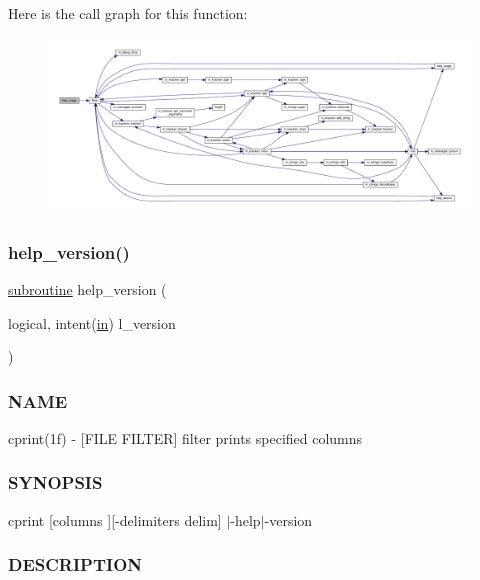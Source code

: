 Here is the call graph for this function\+:
\nopagebreak
\begin{figure}[H]
\begin{center}
\leavevmode
\includegraphics[width=350pt]{cprint_8f90_a3e09a3b52ee8fb04eeb93fe5761626a8_cgraph}
\end{center}
\end{figure}
\mbox{\label{cprint_8f90_a39c21619b08a3c22f19e2306efd7f766}} 
\subsubsection{\texorpdfstring{help\+\_\+version()}{help\_version()}}
{\footnotesize\ttfamily \hyperlink{M__stopwatch_83_8txt_acfbcff50169d691ff02d4a123ed70482}{subroutine} help\+\_\+version (\begin{DoxyParamCaption}\item[{logical, intent(\hyperlink{M__journal_83_8txt_afce72651d1eed785a2132bee863b2f38}{in})}]{l\+\_\+version }\end{DoxyParamCaption})}



\subsubsection*{N\+A\+ME}

cprint(1f) -\/ \mbox{[}F\+I\+LE F\+I\+L\+T\+ER\mbox{]} filter prints specified columns \subsubsection*{S\+Y\+N\+O\+P\+S\+IS}

cprint \mbox{[}columns \mbox{]}\mbox{[}-\/delimiters delim\mbox{]} $\vert$-\/help$\vert$-\/version

\subsubsection*{D\+E\+S\+C\+R\+I\+P\+T\+I\+ON}

